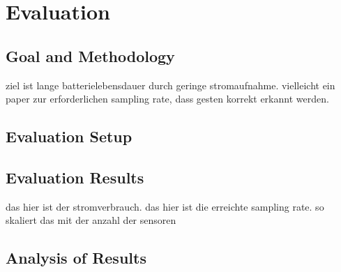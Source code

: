 \chapter{Evaluation}
\label{ch:evaluation}

\section{Goal and Methodology}
ziel ist lange batterielebensdauer durch geringe stromaufnahme.
vielleicht ein paper zur erforderlichen sampling rate, dass gesten korrekt erkannt werden.

\section{Evaluation Setup}

\section{Evaluation Results}
das hier ist der stromverbrauch. das hier ist die erreichte sampling rate. so skaliert das mit der anzahl der sensoren

\section{Analysis of Results}
